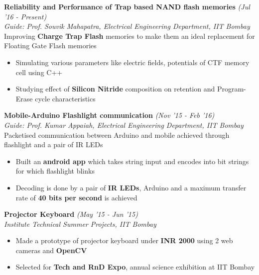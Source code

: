 \documentclass[10.99pt]{article}
\begin{document}
\textbf{Reliability and Performance of Trap based NAND flash memories } \hfill{\sl \small (Jul '16 - Present)}\\
{\it Guide: Prof. Souvik Mahapatra, Electrical Engineering Department, IIT Bombay}\hfill{}\\
Improving {\bf Charge Trap Flash} memories to make them an ideal replacement for Floating Gate Flash memories\\ 
\vspace{-18pt}
\begin{itemize}[itemsep = -0.75 mm, leftmargin=*]
    \item Simulating various parameters like electric fields, potentials of CTF memory cell using C++
    \item Studying effect of {\bf Silicon Nitride} composition on retention and Program-Erase cycle characteristics
\end{itemize}
\textbf{Mobile-Arduino Flashlight communication} \hfill{\sl \small (Nov '15 - Feb '16)}\\
{\it Guide: Prof. Kumar Appaiah, Electrical Engineering Department, IIT Bombay}\hfill{}\\
Packetised communication between Arduino and mobile achieved through flashlight and a pair of IR LEDs\\
\vspace{-18pt} 
\begin{itemize}[itemsep = -0.75 mm, leftmargin=*]
    \item Built an {\bf android app} which takes string input and encodes into bit strings for which flashlight blinks
    \item Decoding is done by a pair of {\bf IR LEDs}, Arduino and a maximum transfer rate of {\bf 40 bits per second} is achieved
\end{itemize}
\textbf{Projector Keyboard} \hfill{\sl \small (May '15 - Jun '15)}\\%
{\it Institute Technical Summer Projects, IIT Bombay}\\
\vspace{-18pt}
\begin{itemize}[itemsep = -0.75 mm, leftmargin=*]%
  \item Made a prototype of projector keyboard under {\bf INR 2000} using 2 web cameras and {\bf OpenCV}
  \item Selected for {\bf Tech and RnD Expo}, annual science exhibition at IIT Bombay
\end{itemize}
\vspace{-10pt}
\end{document}
